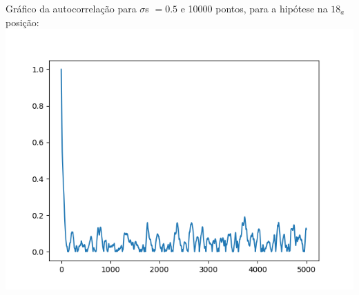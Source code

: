 \documentclass[pt12]{article}
\begin{document}
\begin{center}
Gráfico da autocorrelação para $\sigma$s $= 0.5$ e 10000 pontos, para a hipótese na $18_a$ posição:\\
\includegraphics[scale=0.5]{Autocorr10000hip18(0,5).png}\\
\end{center}
\newpage
\end{document}
